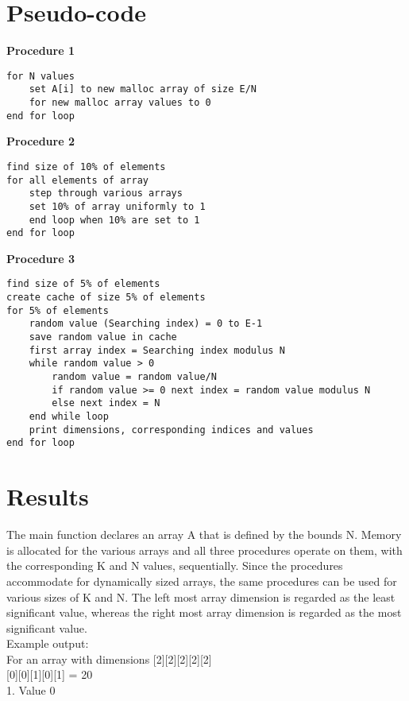 \documentclass[conference]{IEEEtran}
\begin{document}
\section{Pseudo-code}

\textbf{Procedure 1}
\begin{Verbatim}
for N values
	set A[i] to new malloc array of size E/N
	for new malloc array values to 0
end for loop
\end{Verbatim}
\textbf{Procedure 2}
\begin{Verbatim}
find size of 10% of elements
for all elements of array
	step through various arrays
	set 10% of array uniformly to 1
	end loop when 10% are set to 1
end for loop
\end{Verbatim}
\textbf{Procedure 3}
\begin{Verbatim}
find size of 5% of elements
create cache of size 5% of elements
for 5% of elements 
	random value (Searching index) = 0 to E-1
	save random value in cache
	first array index = Searching index modulus N
	while random value > 0
		random value = random value/N
		if random value >= 0 next index = random value modulus N
		else next index = N
	end while loop
	print dimensions, corresponding indices and values
end for loop
\end{Verbatim}

\section{Results}
The main function declares an array A that is defined by the bounds N. Memory is allocated for the various arrays and all three procedures operate on them, with the corresponding K and N values, sequentially. Since the procedures accommodate for dynamically sized arrays, the same procedures can be used for various sizes of K and N. The left most array dimension is regarded as the least significant value, whereas the right most array dimension is regarded as the most significant value.\\

Example output:\\

For an array with dimensions [2][2][2][2][2]\\

[0][0][1][0][1] = 20\\

1. Value 0
\end{document}
